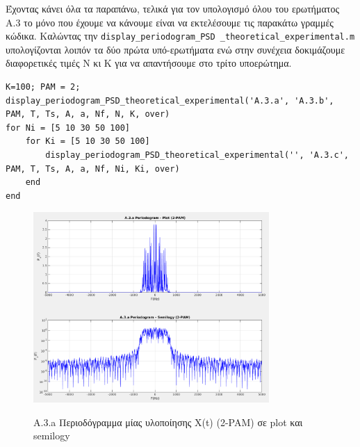 \documentclass[11pt]{article}
\begin{document}
    \par \noindent
    Έχοντας κάνει όλα τα παραπάνω, τελικά για τον υπολογισμό όλου του ερωτήματος Α.3 το μόνο που έχουμε να κάνουμε είναι να εκτελέσουμε τις παρακάτω γραμμές κώδικα.
    Καλώντας την \texttt{display\_periodogram\_PSD \_theoretical\_experimental.m} υπολογίζονται λοιπόν τα δύο πρώτα υπό-ερωτήματα ενώ στην συνέχεια δοκιμάζουμε διαφορετικές τιμές Ν κι Κ για να απαντήσουμε στο τρίτο υποερώτημα.
    
    \begin{lstlisting}[caption = {A.3 Periodogram - theoretical and practical PSD}]
K=100; PAM = 2;
display_periodogram_PSD_theoretical_experimental('A.3.a', 'A.3.b', PAM, T, Ts, A, a, Nf, N, K, over)
for Ni = [5 10 30 50 100] 
    for Ki = [5 10 30 50 100]
        display_periodogram_PSD_theoretical_experimental('', 'A.3.c', PAM, T, Ts, A, a, Nf, Ni, Ki, over)
    end
end
    \end{lstlisting}
    
      \begin{figure}[H]
        \centering
        \includegraphics[scale=0.5, width=0.8\textwidth]{figures/A3.1-Periodogram.png} \\
        \caption{A.3.a Περιοδόγραμμα μίας υλοποίησης X(t) (2-PAM) σε plot και semilogy}
    \end{figure}
    
\end{document}
